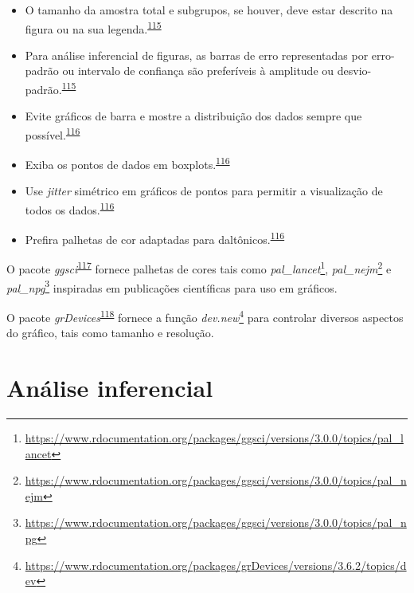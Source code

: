 \documentclass[
  a4paper,
]{book}
\renewcommand{\href}[2]{#2\footnote{\url{#1}}}
\newenvironment{infobox}[1]
  {
  \begin{itemize}
  \renewcommand{\labelitemi}{
    \raisebox{-.7\height}[0pt][0pt]{
      {\setkeys{Gin}{width=3em,keepaspectratio}
        \texttt{[image: \#1]}}
    }
  }
  \setlength{\fboxsep}{1em}
  \begin{blackbox}
  \item
  }
  {
  \end{blackbox}
  \end{itemize}
  }
\begin{document}
\begin{itemize}
\item
  O tamanho da amostra total e subgrupos, se houver, deve estar descrito na figura ou na sua legenda.\textsuperscript{\protect\hyperlink{ref-Cumming2007}{115}}
\item
  Para análise inferencial de figuras, as barras de erro representadas por erro-padrão ou intervalo de confiança são preferíveis à amplitude ou desvio-padrão.\textsuperscript{\protect\hyperlink{ref-Cumming2007}{115}}
\item
  Evite gráficos de barra e mostre a distribuição dos dados sempre que possível.\textsuperscript{\protect\hyperlink{ref-Weissgerber2019}{116}}
\item
  Exiba os pontos de dados em boxplots.\textsuperscript{\protect\hyperlink{ref-Weissgerber2019}{116}}
\item
  Use \emph{jitter} simétrico em gráficos de pontos para permitir a visualização de todos os dados.\textsuperscript{\protect\hyperlink{ref-Weissgerber2019}{116}}
\item
  Prefira palhetas de cor adaptadas para daltônicos.\textsuperscript{\protect\hyperlink{ref-Weissgerber2019}{116}}
\end{itemize}

\begin{infobox}{images/Rlogo}
O pacote \emph{ggsci}\textsuperscript{\protect\hyperlink{ref-ggsci}{117}} fornece palhetas de cores tais como \href{https://www.rdocumentation.org/packages/ggsci/versions/3.0.0/topics/pal_lancet}{\emph{pal\_lancet}}, \href{https://www.rdocumentation.org/packages/ggsci/versions/3.0.0/topics/pal_nejm}{\emph{pal\_nejm}} e \href{https://www.rdocumentation.org/packages/ggsci/versions/3.0.0/topics/pal_npg}{\emph{pal\_npg}} inspiradas em publicações científicas para uso em gráficos.

\end{infobox}

\begin{infobox}{images/Rlogo}
O pacote \emph{grDevices}\textsuperscript{\protect\hyperlink{ref-grDevices}{118}} fornece a função \href{https://www.rdocumentation.org/packages/grDevices/versions/3.6.2/topics/dev}{\emph{dev.new}} para controlar diversos aspectos do gráfico, tais como tamanho e resolução.

\end{infobox}

\hypertarget{analise-inferencial}{%
\chapter{\texorpdfstring{\textbf{Análise inferencial}}{Análise inferencial}}\label{analise-inferencial}}
\end{document}
